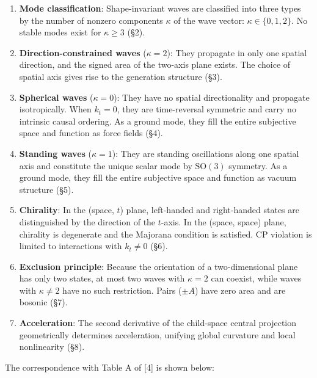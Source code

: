 \documentclass[
  a4paper,11pt]{article}
\theoremstyle{definition}
\theoremstyle{remark}
\begin{document}
\begin{enumerate}
\def\labelenumi{\arabic{enumi}.}
\item
  \textbf{Mode classification}: Shape-invariant waves are classified
  into three types by the number of nonzero components \(\kappa\) of the
  wave vector: \(\kappa \in \{0, 1, 2\}\). No stable modes exist for
  \(\kappa \geq 3\) (§2).
\item
  \textbf{Direction-constrained waves} (\(\kappa = 2\)): They propagate
  in only one spatial direction, and the signed area of the two-axis
  plane exists. The choice of spatial axis gives rise to the generation
  structure (§3).
\item
  \textbf{Spherical waves} (\(\kappa = 0\)): They have no spatial
  directionality and propagate isotropically. When \(k_t = 0\), they are
  time-reversal symmetric and carry no intrinsic causal ordering. As a
  ground mode, they fill the entire subjective space and function as
  force fields (§4).
\item
  \textbf{Standing waves} (\(\kappa = 1\)): They are standing
  oscillations along one spatial axis and constitute the unique scalar
  mode by \(\mathrm{SO}(3)\) symmetry. As a ground mode, they fill the
  entire subjective space and function as vacuum structure (§5).
\item
  \textbf{Chirality}: In the (space, \(t\)) plane, left-handed and
  right-handed states are distinguished by the direction of the
  \(t\)-axis. In the (space, space) plane, chirality is degenerate and
  the Majorana condition is satisfied. CP violation is limited to
  interactions with \(k_t \neq 0\) (§6).
\item
  \textbf{Exclusion principle}: Because the orientation of a
  two-dimensional plane has only two states, at most two waves with
  \(\kappa = 2\) can coexist, while waves with \(\kappa \neq 2\) have no
  such restriction. Pairs (\(\pm A\)) have zero area and are bosonic
  (§7).
\item
  \textbf{Acceleration}: The second derivative of the child-space
  central projection geometrically determines acceleration, unifying
  global curvature and local nonlinearity (§8).
\end{enumerate}

The correspondence with Table A of {[}4{]} is shown below:
\end{document}
